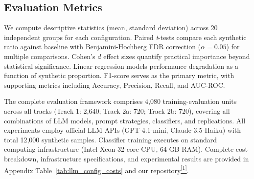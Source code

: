 \subsection{Evaluation Metrics}

We compute descriptive statistics (mean, standard deviation) across 20 independent groups for each configuration. Paired \textit{t}-tests compare each synthetic ratio against baseline with Benjamini-Hochberg FDR correction ($\alpha = 0.05$) for multiple comparisons. Cohen's $d$ effect sizes quantify practical importance beyond statistical significance. Linear regression models performance degradation as a function of synthetic proportion. F1-score serves as the primary metric, with supporting metrics including Accuracy, Precision, Recall, and AUC-ROC.

The complete evaluation framework comprises 4,080 training-evaluation units across all tracks (Track 1: 2,640; Track 2a: 720; Track 2b: 720), covering all combinations of LLM models, prompt strategies, classifiers, and replications. All experiments employ official LLM APIs (GPT-4.1-mini, Claude-3.5-Haiku) with total 12,000 synthetic samples. Classifier training executes on standard computing infrastructure (Intel Xeon 32-core CPU, 64 GB RAM). Complete cost breakdown, infrastructure specifications, and experimental results are provided in Appendix Table~\ref{tab:llm_config_costs} and our repository\href{https://github.com/tisage/llm-synthetic-spam-benchmark}{\textsuperscript{[1]}}.
